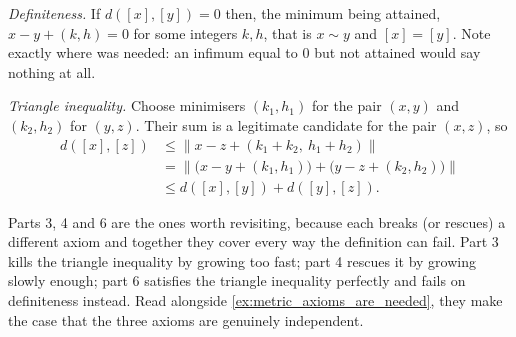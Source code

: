 \begin{exercisesolution}
\begin{enumerate}[label=\textbf{\arabic*.}]
    \textit{Definiteness.} If $d([x],[y]) = 0$ then, the minimum being attained,
    $x-y+(k,h) = 0$ for some integers $k,h$, that is $x \sim y$ and $[x] = [y]$. Note exactly
    where  was needed: an infimum equal to $0$ but not attained
    would say nothing at all.

    \textit{Triangle inequality.} Choose minimisers $(k_1,h_1)$ for the pair $(x,y)$ and
    $(k_2,h_2)$ for $(y,z)$. Their sum is a legitimate candidate for the pair $(x,z)$, so
    \begin{align*}
      d([x],[z]) &\leq \big\lVert x-z+(k_1{+}k_2,\ h_1{+}h_2)\big\rVert \\
      &= \big\lVert \big(x-y+(k_1,h_1)\big) + \big(y-z+(k_2,h_2)\big)\big\rVert \\
      &\leq d([x],[y]) + d([y],[z]).
    \end{align*}
\end{enumerate}
\end{exercisesolution}

\begin{ainote}
Parts 3, 4 and 6 are the ones worth revisiting, because each breaks (or rescues) a different
axiom and together they cover every way the definition can fail. Part 3 kills the triangle
inequality by growing too fast; part 4 rescues it by growing slowly enough; part 6 satisfies the
triangle inequality perfectly and fails on definiteness instead. Read alongside
\cref{ex:metric_axioms_are_needed}, they make the case that the three axioms are genuinely
independent.
\end{ainote}

